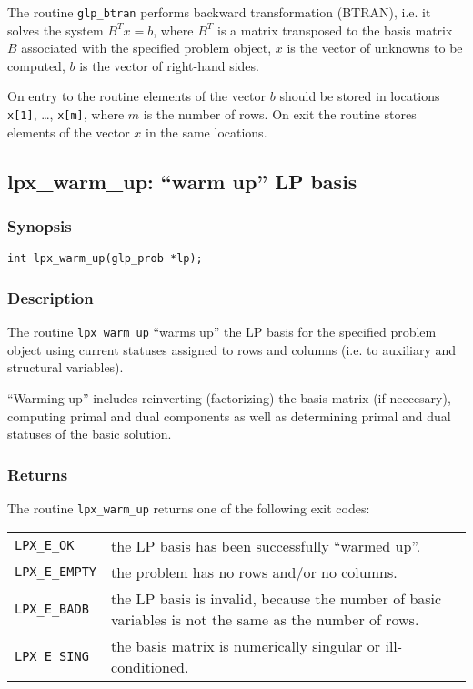 The routine \verb|glp_btran| performs backward transformation (BTRAN),
i.e. it solves the system $B^Tx=b$, where $B^T$ is a matrix transposed
to the basis matrix $B$ associated with the specified problem object,
$x$ is the vector of unknowns to be computed, $b$ is the vector of
right-hand sides.

On entry to the routine elements of the vector $b$ should be stored in
locations \verb|x[1]|, \dots, \verb|x[m]|, where $m$ is the number of
rows. On exit the routine stores elements of the vector $x$ in the same
locations.


\newpage

\subsection{lpx\_warm\_up: ``warm up'' LP basis}

\subsubsection*{Synopsis}

\begin{verbatim}
int lpx_warm_up(glp_prob *lp);
\end{verbatim}

\subsubsection*{Description}

The routine \verb|lpx_warm_up| ``warms up'' the LP basis for the
specified problem object using current statuses assigned to rows and
columns (i.e. to auxiliary and structural variables).

``Warming up'' includes reinverting (factorizing) the basis matrix (if
neccesary), computing primal and dual components as well as determining
primal and dual statuses of the basic solution.

\subsubsection*{Returns}

The routine \verb|lpx_warm_up| returns one of the following exit codes:

\begin{tabular}{@{}p{25mm}p{91.3mm}@{}}
\verb|LPX_E_OK| & the LP basis has been successfully ``warmed up''. \\
\verb|LPX_E_EMPTY|  & the problem has no rows and/or no columns. \\
\verb|LPX_E_BADB|   & the LP basis is invalid, because the number of
   basic variables is not the same as the number of rows. \\
\verb|LPX_E_SING|   & the basis matrix is numerically singular or
   ill-condi\-tioned.
\end{tabular}


